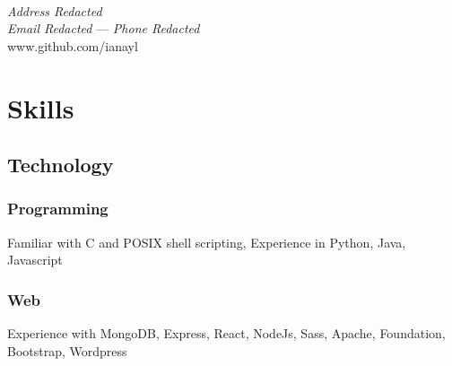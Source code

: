 \documentclass{article}
\author{Ian Li}
\renewcommand{\maketitle}{
		\vspace{-4em}
		{\huge\bfseries
		\theauthor}
	\vspace{1em}
	\\
    \textit{Address Redacted} \\
    \textit{Email Redacted} --- \textit{Phone Redacted} \\
	www.github.com/ianayl
}
\begin{document}
\maketitle


\section{Skills}

\subsection{Technology}

\subsubsection{Programming}
Familiar with C and POSIX shell scripting, Experience in Python, Java, Javascript

\subsubsection{Web}
Experience with MongoDB, Express, React, NodeJs, Sass, Apache, Foundation, Bootstrap, Wordpress

\end{document}
